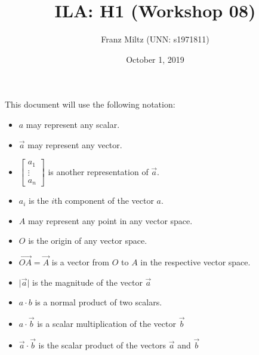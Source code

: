 \documentclass{article}
\title{ILA: H1 (Workshop 08)}
\author{Franz Miltz (UNN: s1971811)}
\date{October 1, 2019}
\begin{document}
\maketitle
This document will use the following notation:
\begin{itemize}
    \item $a$ may represent any scalar.
    \item $\vec{a}$ may represent any vector.
    \item $\begin{bmatrix}
        a_1\\
        \vdots\\
        a_n
    \end{bmatrix}$ is another representation of $\vec a$. 
    \item $a_i$ is the $i$th component of the vector $a$.
    \item $A$ may represent any point in any vector space.
    \item $O$ is the origin of any vector space.
    \item $\vec{OA}=\vec{A}$ is a vector from $O$ to $A$ in the respective vector space.
    \item $\vert\vec{a}\vert$ is the magnitude of the vector $\vec{a}$
    \item $a\cdot b$ is a normal product of two scalars.
    \item $a\cdot\vec{b}$ is a scalar multiplication of the vector $\vec{b}$
    \item $\vec{a}\cdot\vec{b}$ is the scalar product of the vectors $\vec{a}$ and $\vec{b}$
\end{itemize}
\end{document}
